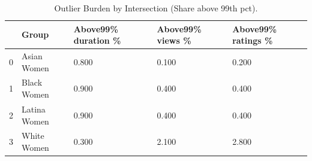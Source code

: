 \begin{table}[htbp]
\centering
\caption{Outlier Burden by Intersection (Share above 99th pct).}
\label{tab:eda_outlier_burden}
\begin{tabular}{lllll}
\toprule
 & Group & Above99\% duration \% & Above99\% views \% & Above99\% ratings \% \\
\midrule
0 & Asian Women & 0.800 & 0.100 & 0.200 \\
1 & Black Women & 0.900 & 0.400 & 0.400 \\
2 & Latina Women & 0.900 & 0.400 & 0.400 \\
3 & White Women & 0.300 & 2.100 & 2.800 \\
\bottomrule
\end{tabular}

\end{table}